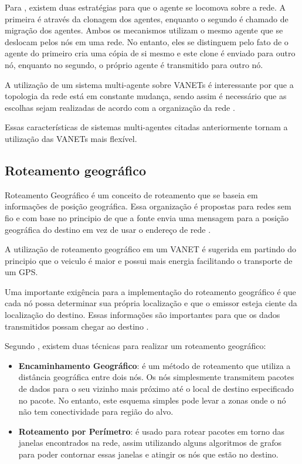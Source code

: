Para \cite{Freitas:2011}, existem duas estratégias para que o agente se locomova sobre a rede. A primeira é através da clonagem dos agentes, enquanto o segundo é chamado de migração dos agentes. Ambos os mecanismos utilizam o mesmo agente que se deslocam pelos nós em uma rede. No entanto, eles se distinguem pelo fato de o agente do primeiro cria uma cópia de si mesmo e este clone é enviado para outro nó, enquanto no segundo, o próprio agente é transmitido para outro nó.


A utilização de um sistema multi-agente sobre VANETs é interessante por que a topologia da rede está em constante mudança, sendo assim é necessário que as escolhas sejam realizadas de acordo com a organização da rede \cite{Freitas:2011}. 

Essas características de sistemas multi-agentes citadas anteriormente tornam a utilização das VANETs mais flexível.  

\subsection{Roteamento geográfico}

Roteamento Geográfico é um conceito de roteamento que se baseia em informações de posição geográfica. Essa organização é propostas para redes sem fio e com base no principio de que a fonte envia uma mensagem para a posição geográfica do destino em vez de usar o endereço de rede \cite{Shu:2010}. 

A utilização de roteamento geográfico em um VANET é sugerida em \cite{Freitas:2011} partindo do principio que o veiculo é maior e possui mais energia facilitando o transporte de um GPS.


Uma importante exigência para a implementação do roteamento geográfico é que cada nó possa determinar sua própria localização e que o emissor esteja ciente da localização do destino. Essas informações são importantes para que os dados transmitidos possam chegar ao destino \cite{Guise:2011}.

Segundo \cite{Taylor:2006}, existem duas técnicas para realizar um roteamento geográfico: 

\begin{itemize}
\item \textbf{Encaminhamento Geográfico}: é um método de roteamento que utiliza a distância geográfica entre dois nós. Os nós simplesmente transmitem pacotes de dados para o seu vizinho mais próximo até o local de destino especificado no pacote. No entanto, este esquema simples pode levar a zonas onde o nó não tem conectividade para região do alvo. 

\item \textbf{Roteamento por Perímetro}: é usado para rotear pacotes em torno das janelas encontrados na rede, assim utilizando alguns algoritmos de grafos para poder contornar essas janelas e atingir os nós que estão no destino.

\end{itemize}

